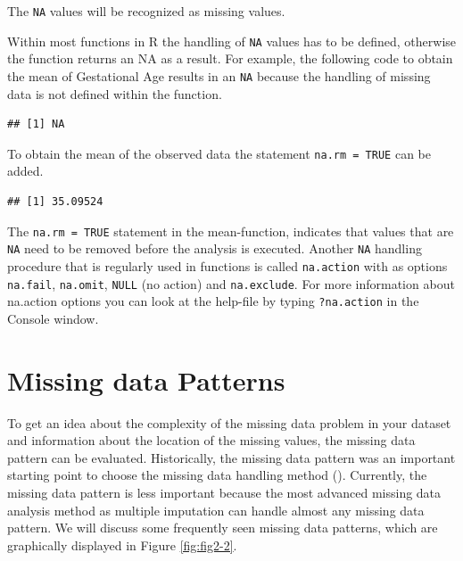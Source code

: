 \documentclass[]{book}
\newenvironment{Shaded}{\begin{snugshade}}{\end{snugshade}}
\newcommand{\KeywordTok}[1]{\textcolor[rgb]{0.13,0.29,0.53}{\textbf{#1}}}
\newcommand{\DataTypeTok}[1]{\textcolor[rgb]{0.13,0.29,0.53}{#1}}
\newcommand{\OtherTok}[1]{\textcolor[rgb]{0.56,0.35,0.01}{#1}}
\newcommand{\OperatorTok}[1]{\textcolor[rgb]{0.81,0.36,0.00}{\textbf{#1}}}
\newcommand{\NormalTok}[1]{#1}
\begin{document}
The \texttt{NA} values will be recognized as missing values.

Within most functions in R the handling of \texttt{NA} values has to be
defined, otherwise the function returns an NA as a result. For example,
the following code to obtain the mean of Gestational Age results in an
\texttt{NA} because the handling of missing data is not defined within
the function.

\begin{Shaded}
\end{Shaded}

\begin{verbatim}
## [1] NA
\end{verbatim}

To obtain the mean of the observed data the statement
\texttt{na.rm\ =\ TRUE} can be added.

\begin{Shaded}
\end{Shaded}

\begin{verbatim}
## [1] 35.09524
\end{verbatim}

The \texttt{na.rm\ =\ TRUE} statement in the mean-function, indicates
that values that are \texttt{NA} need to be removed before the analysis
is executed. Another \texttt{NA} handling procedure that is regularly
used in functions is called \texttt{na.action} with as options
\texttt{na.fail}, \texttt{na.omit}, \texttt{NULL} (no action) and
\texttt{na.exclude}. For more information about na.action options you
can look at the help-file by typing \texttt{?na.action} in the Console
window.

\section{Missing data Patterns}\label{missing-data-patterns}

To get an idea about the complexity of the missing data problem in your
dataset and information about the location of the missing values, the
missing data pattern can be evaluated. Historically, the missing data
pattern was an important starting point to choose the missing data
handling method (\citet{little1987statistical}). Currently, the missing
data pattern is less important because the most advanced missing data
analysis method as multiple imputation can handle almost any missing
data pattern. We will discuss some frequently seen missing data
patterns, which are graphically displayed in Figure \ref{fig:fig2-2}.
\end{document}
